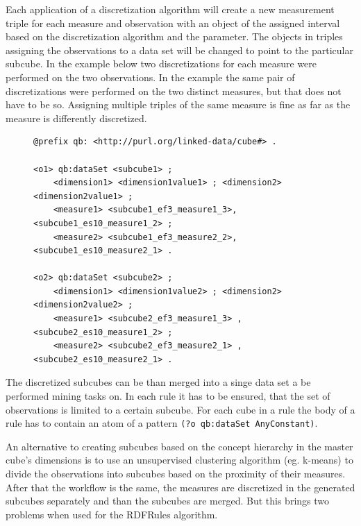 Each application of a discretization algorithm will create a new measurement triple for each measure and observation with an object of the assigned interval based on the discretization algorithm and the parameter. The objects in triples assigning the observations to a data set will be changed to point to the particular subcube. In the example below two discretizations for each measure were performed on the two observations. In the example the same pair of discretizations were performed on the two distinct measures, but that does not have to be so. Assigning multiple triples of the same measure is fine as far as the measure is differently discretized. 

\begin{figure}[h]
\begin{lstlisting}[language = turtle, caption={Discretization example}, label={discsample},captionpos=b escapeinside={(*@}{@*)}]
@prefix qb: <http://purl.org/linked-data/cube#> .
        
<o1> qb:dataSet <subcube1> ;
    <dimension1> <dimension1value1> ; <dimension2> <dimension2value1> ;
    <measure1> <subcube1_ef3_measure1_3>, <subcube1_es10_measure1_2> ;
    <measure2> <subcube1_ef3_measure2_2>, <subcube1_es10_measure2_1> .

<o2> qb:dataSet <subcube2> ;
    <dimension1> <dimension1value2> ; <dimension2> <dimension2value2> ;
    <measure1> <subcube2_ef3_measure1_3> , <subcube2_es10_measure1_2> ;
    <measure2> <subcube2_ef3_measure2_1> ,<subcube2_es10_measure2_1> .
\end{lstlisting}
\end{figure}

The discretized subcubes can be than merged into a singe data set a be performed mining tasks on. In each rule it has to be ensured, that the set of observations is limited to a certain subcube. For each cube in a rule the body of a rule has to contain an atom of a pattern \verb|(?o qb:dataSet AnyConstant)|. 

An alternative to creating subcubes based on the concept hierarchy in the master cube's dimensions is to use an unsupervised clustering algorithm (eg. k-means) to divide the observations into subcubes based on the proximity of their measures. After that the workflow is the same, the measures are discretized in the generated subcubes separately and than the subcubes are merged. But this brings two problems when used for the RDFRules algorithm.

